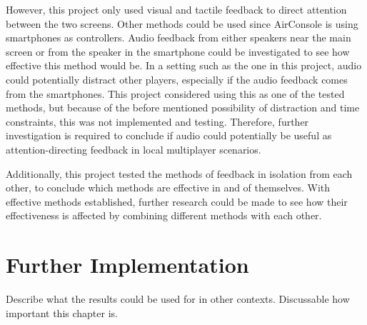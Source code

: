 However, this project only used visual and tactile feedback to direct attention between the two screens. Other methods could be used since AirConsole is using smartphones as controllers. Audio feedback from either speakers near the main screen or from the speaker in the smartphone could be investigated to see how effective this method would be. In a setting such as the one in this project, audio could potentially distract other players, especially if the audio feedback comes from the smartphones. This project considered using this as one of the tested methods, but because of the before mentioned possibility of distraction and time constraints, this was not implemented and testing. Therefore, further investigation is required to conclude if audio could potentially be useful as attention-directing feedback in local multiplayer scenarios.

Additionally, this project tested the methods of feedback in isolation from each other, to conclude which methods are effective in and of themselves. With effective methods established, further research could be made to see how their effectiveness is affected by combining different methods with each other.

\section{Further Implementation}\label{sec:further_implementation}
Describe what the results could be used for in other contexts. Discussable how important this chapter is.